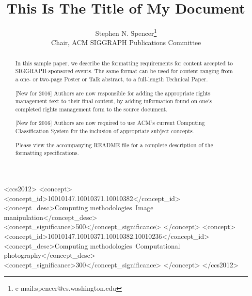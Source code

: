 \documentclass{acmsiggraph}
\title{This Is The Title of My Document}
\author{Stephen N. Spencer\thanks{e-mail:spencer@cs.washington.edu}\\Chair, ACM SIGGRAPH Publications Committee}
\begin{document}


\maketitle

\begin{abstract}

In this sample paper, we describe the formatting requirements for
content accepted to SIGGRAPH-sponsored events. The same format can be
used for content ranging from a one- or two-page Poster or Talk abstract, to a
full-length Technical Paper. 

[New for 2016] Authors are now responsible for adding the appropriate rights management
text to their final content, by adding information found on one's completed 
rights management form to the source document.

[New for 2016] Authors are now required to use ACM's current Computing Classification
System for the inclusion of appropriate subject concepts.

Please view the accompanying README file for a complete description of the formatting
specifications.

\end{abstract}

%
%
\begin{CCSXML}
<ccs2012>
<concept>
<concept_id>10010147.10010371.10010382</concept_id>
<concept_desc>Computing methodologies~Image manipulation</concept_desc>
<concept_significance>500</concept_significance>
</concept>
<concept>
<concept_id>10010147.10010371.10010382.10010236</concept_id>
<concept_desc>Computing methodologies~Computational photography</concept_desc>
<concept_significance>300</concept_significance>
</concept>
</ccs2012>
\end{CCSXML}


%
%

\end{document}
